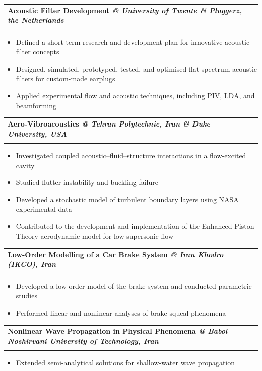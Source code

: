 \documentclass[a4paper,11pt]{article}
\makeatletter
\newcommand{\resumeSubheading}[4]{
\vspace{0.5mm}\item
    \begin{tabular*}{0.98\textwidth}[t]{l@{\extracolsep{\fill}}r}
        \textbf{#1} & \textit{\footnotesize{#4}} \\
        \textit{\footnotesize{#3}} &  \footnotesize{#2}\\
    \end{tabular*}
    \vspace{-2.4mm}
}
\newcommand{\resumeItemListStart}{\begin{itemize}[leftmargin=*,labelsep=1mm,itemsep=0.5mm]}
\newcommand{\resumeItemListEnd}{\end{itemize}\vspace{-2mm}}
\makeatother
\begin{document}
\resumeSubheading
    {Acoustic Filter Development
    {\color{blue}\textit{@ University of Twente \& Pluggerz, the Netherlands}}}{}{}{}

\resumeItemListStart
    \item Defined a short-term research and development plan for innovative acoustic-filter concepts
    \item Designed, simulated, prototyped, tested, and optimised flat-spectrum acoustic filters for custom-made earplugs
    \item Applied experimental flow and acoustic techniques, including PIV, LDA, and beamforming
\resumeItemListEnd

\resumeSubheading
    {Aero-Vibroacoustics
    {\color{blue}\textit{@ Tehran Polytechnic, Iran \& Duke University, USA}}}{}{}{}

\resumeItemListStart
    \item Investigated coupled acoustic--fluid--structure interactions in a flow-excited cavity
    \item Studied flutter instability and buckling failure
    \item Developed a stochastic model of turbulent boundary layers using NASA experimental data
    \item Contributed to the development and implementation of the Enhanced Piston Theory aerodynamic model for low-supersonic flow
\resumeItemListEnd

\resumeSubheading
    {Low-Order Modelling of a Car Brake System
    {\color{blue}\textit{@ Iran Khodro (IKCO), Iran}}}{}{}{}

\resumeItemListStart
    \item Developed a low-order model of the brake system and conducted parametric studies
    \item Performed linear and nonlinear analyses of brake-squeal phenomena
\resumeItemListEnd

\resumeSubheading
    {Nonlinear Wave Propagation in Physical Phenomena
    {\color{blue}\textit{@ Babol Noshirvani University of Technology, Iran}}}{}{}{}

\resumeItemListStart
    \item Extended semi-analytical solutions for shallow-water wave propagation
\resumeItemListEnd
\end{document}
